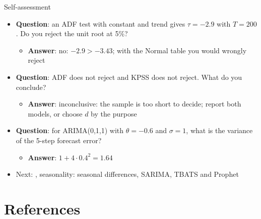 \begin{frame}{Self-assessment}
\itemsize{\small}
\begin{itemize}
    \item \textbf{Question}: an ADF test with constant and trend gives $\tau = -2.9$ with $T = 200$. Do you reject the unit root at 5\%?
    \begin{itemize}
        \item \textbf{Answer}: no: $-2.9 > -3.43$; with the Normal table you would wrongly reject
    \end{itemize}
    \item \textbf{Question}: ADF does not reject and KPSS does not reject. What do you conclude?
    \begin{itemize}
        \item \textbf{Answer}: inconclusive: the sample is too short to decide; report both models, or choose $d$ by the purpose
    \end{itemize}
    \item \textbf{Question}: for ARIMA(0,1,1) with $\theta = -0.6$ and $\sigma = 1$, what is the variance of the 5-step forecast error?
    \begin{itemize}
        \item \textbf{Answer}: $1 + 4 \cdot 0.4^2 = 1.64$
    \end{itemize}
    \item Next: , seasonality: seasonal differences, SARIMA, TBATS and Prophet
\end{itemize}
\end{frame}


\section{References}

